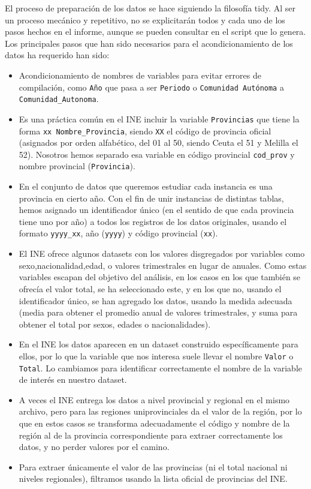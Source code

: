 \documentclass[data,article,submit,moreauthors,pdftex]{Definitions/mdpi}
\begin{document}
El proceso de preparación de los datos se hace siguiendo la filosofía
tidy. Al ser un proceso mecánico y repetitivo, no se explicitarán todos
y cada uno de los pasos hechos en el informe, aunque se pueden consultar
en el script que lo genera. Los principales pasos que han sido
necesarios para el acondicionamiento de los datos ha requerido han sido:

\begin{itemize}
\item
  Acondicionamiento de nombres de variables para evitar errores de
  compilación, como \texttt{Año} que pasa a ser \texttt{Periodo} o
  \texttt{Comunidad\ Autónoma} a \texttt{Comunidad\_Autonoma}.
\item
  Es una práctica común en el INE incluir la variable
  \texttt{Provincias} que tiene la forma \texttt{xx\ Nombre\_Provincia},
  siendo \texttt{XX} el código de provincia oficial (asignados por orden
  alfabético, del 01 al 50, siendo Ceuta el 51 y Melilla el 52).
  Nosotros hemos separado esa variable en código provincial
  \texttt{cod\_prov} y nombre provincial (\texttt{Provincia}).
\item
  En el conjunto de datos que queremos estudiar cada instancia es una
  provincia en cierto año. Con el fin de unir instancias de distintas
  tablas, hemos asignado un identificador único (en el sentido de que
  cada provincia tiene uno por año) a todos los registros de los datos
  originales, usando el formato \texttt{yyyy\_xx}, año (\texttt{yyyy}) y
  código provincial (\texttt{xx}).
\item
  El INE ofrece algunos datasets con los valores disgregados por
  variables como sexo,nacionalidad,edad, o valores trimestrales en lugar
  de anuales. Como estas variables escapan del objetivo del análisis, en
  los casos en los que también se ofrecía el valor total, se ha
  seleccionado este, y en los que no, usando el identificador único, se
  han agregado los datos, usando la medida adecuada (media para obtener
  el promedio anual de valores trimestrales, y suma para obtener el
  total por sexos, edades o nacionalidades).
\item
  En el INE los datos aparecen en un dataset construido específicamente
  para ellos, por lo que la variable que nos interesa suele llevar el
  nombre \texttt{Valor} o \texttt{Total}. Lo cambiamos para identificar
  correctamente el nombre de la variable de interés en nuestro dataset.
\item
  A veces el INE entrega los datos a nivel provincial y regional en el
  mismo archivo, pero para las regiones uniprovinciales da el valor de
  la región, por lo que en estos casos se transforma adecuadamente el
  código y nombre de la región al de la provincia correspondiente para
  extraer correctamente los datos, y no perder valores por el camino.
\item
  Para extraer únicamente el valor de las provincias (ni el total
  nacional ni niveles regionales), filtramos usando la lista oficial de
  provincias del INE.
\end{itemize}
\end{document}
